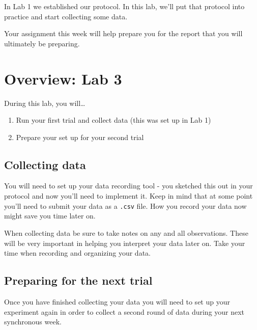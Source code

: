 \documentclass[
]{book}
\providecommand{\tightlist}{%
  \setlength{\itemsep}{0pt}\setlength{\parskip}{0pt}}
\begin{document}
In Lab 1 we established our protocol. In this lab, we'll put that protocol into practice and start collecting some data.

Your assignment this week will help prepare you for the report that you will ultimately be preparing.

\hypertarget{overview-lab-3}{%
\section*{Overview: Lab 3}\label{overview-lab-3}}

During this lab, you will\ldots{}

\begin{enumerate}
\def\labelenumi{\arabic{enumi}.}
\tightlist
\item
  Run your first trial and collect data (this was set up in Lab 1)
\item
  Prepare your set up for your second trial
\end{enumerate}

\hypertarget{collecting-data}{%
\subsection*{Collecting data}\label{collecting-data}}

You will need to set up your data recording tool - you sketched this out in your protocol and now you'll need to implement it. Keep in mind that at some point you'll need to submit your data as a \texttt{.csv} file. How you record your data now might save you time later on.

When collecting data be sure to take notes on any and all observations. These will be very important in helping you interpret your data later on. Take your time when recording and organizing your data.

\hypertarget{preparing-for-the-next-trial}{%
\subsection*{Preparing for the next trial}\label{preparing-for-the-next-trial}}

Once you have finished collecting your data you will need to set up your experiment again in order to collect a second round of data during your next synchronous week.
\end{document}
